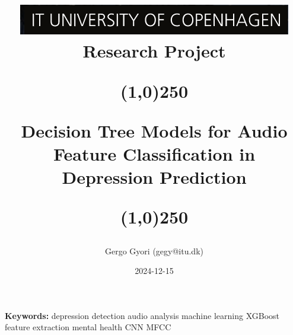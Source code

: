\documentclass{article}
\title{\includegraphics{images/0.ITU-logo.png}\\[1cm] \huge{Research Project}\\
    \begin{center}
    \line(1,0){250}
    \end{center}
    \huge{Decision Tree Models for Audio Feature Classification in Depression Prediction}
    \begin{center}
    \line(1,0){250}
    \end{center}
    }
\author{Gergo Gyori  (gegy@itu.dk)}
\date{2024-12-15}
\begin{document}
\maketitle


\begin{multicols}{2}

\bigskip %
\noindent\textbf{Keywords:} depression detection \textbullet{} audio analysis \textbullet{} machine learning \textbullet{} XGBoost \textbullet{} feature extraction \textbullet{} mental health \textbullet{} CNN \textbullet{} MFCC






%





%


\appendix



\clearpage
\printbibliography

\end{multicols}
\end{document}
